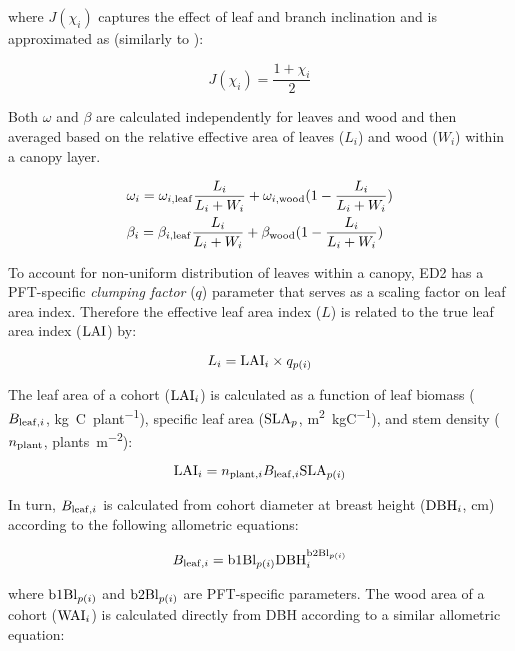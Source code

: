 where $J(\chi_{i})$ captures the effect of leaf and branch inclination and is approximated as (similarly to \citealt{clm45_note}):

\begin{equation}
  J(\chi_{i}) = \frac{1 + \chi_{i}}{2}
\end{equation}

Both $\omega$ and $\beta$ are calculated independently for leaves and wood and then averaged based on the relative effective area of leaves ($L_{i}$) and wood ($W_{i}$) within a canopy layer.

\begin{align}
  & \omega_{i} = \omega_{i, \mathrm{leaf}} \frac{L_{i}}{L_{i} + W_{i}} + \omega_{i, \mathrm{wood}} (1 - \frac{L_{i}}{L_{i} + W_{i}}) \\
  & \beta_{i} = \beta_{i, \mathrm{leaf}} \frac{L_{i}}{L_{i} + W_{i}} + \beta_{\mathrm{wood}} (1 - \frac{L_{i}}{L_{i} + W_{i}})
\end{align}

To account for non-uniform distribution of leaves within a canopy, ED2 has a PFT-specific \emph{clumping factor} ($q$) parameter that serves as a scaling factor on leaf area index.
Therefore the effective leaf area index ($L$) is related to the true leaf area index ($\mathrm{LAI}$) by:

\begin{equation}
  \label{eqn:elai}
  L_{i} = \mathrm{LAI}_{i} \times q_{p(i)}
\end{equation}

The leaf area of a cohort ($\mathrm{LAI}_{i}$) is calculated as a function of leaf biomass ($B_{\mathrm{leaf}, i}$, \unit{kg C ~ plant^{-1}}), specific leaf area ($\mathrm{SLA}_{p}$, \unit{m^2 ~ kgC^{-1}}), and stem density ($n_{\mathrm{plant}}$, \unit{plants ~ m^{-2}}):

\begin{equation}
  \mathrm{LAI}_{i} = n_{\mathrm{plant}, i} B_{\mathrm{leaf}, i} \mathrm{SLA}_{p(i)}
\end{equation}

In turn, $B_{\mathrm{leaf}, i}$ is calculated from cohort diameter at breast height ($\mathrm{DBH}_{i}$, \unit{cm}) according to the following allometric equations:

\begin{equation}
  B_{\mathrm{leaf}, i} = \mathrm{b1Bl}_{p(i)} \mathrm{DBH}_{i}^{\mathrm{b2Bl}_{p(i)}}
\end{equation}

where $\mathrm{b1Bl}_{p(i)}$ and $\mathrm{b2Bl}_{p(i)}$ are PFT-specific parameters.
The wood area of a cohort ($\mathrm{WAI}_{i}$) is calculated directly from DBH according to a similar allometric equation:


